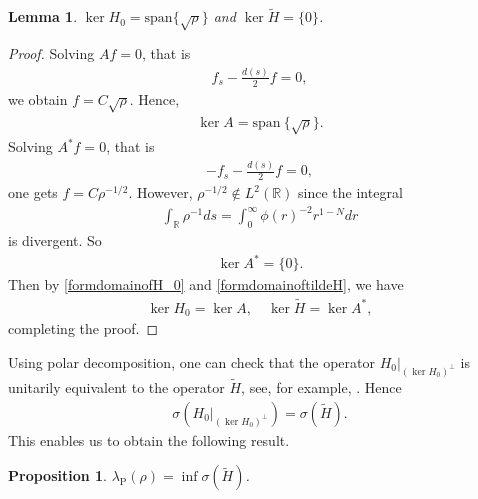 \documentclass{article}
\newtheorem{lemma}[theorem]{Lemma}
\newtheorem{proposition}[theorem]{Proposition}
\theoremstyle{definition} \theoremstyle{remark}
\numberwithin{equation}{section}
\newcommand{\R}{\mathbb{R}}
\newcommand{\la}{\lambda}
\begin{document}
	\begin{lemma}
		$\ker H_0 = \text{span}\{\sqrt{\rho}\}$ and $\ker \widetilde{H} = \{0\}$.
	\end{lemma}

	\begin{proof}
		Solving $Af = 0$, that is
		\begin{align*}
			f_s - \frac{d(s)}{2}f = 0,
		\end{align*}
		we obtain $f = C\sqrt{\rho}$. Hence,
		\begin{align*}
			\ker A = \text{span}~\{\sqrt{\rho}\}.
		\end{align*}
		Solving $A^*f = 0$, that is
		\begin{align*}
			-f_s - \frac{d(s)}{2}f = 0,
		\end{align*}
		one gets $f = C\rho^{-1/2}$. However, $\rho^{-1/2} \notin L^2(\R)$ since the integral
		\begin{align*}
			\int_{\R}\rho^{-1}ds = \int_0^\infty \phi(r)^{-2}r^{1-N}dr
		\end{align*}
		is divergent. So
		\begin{align*}
			\ker A^* = \{0\}.
		\end{align*}
		Then by \eqref{formdomainofH_0} and \eqref{formdomainoftildeH}, we have
		\begin{align*}
			\ker H_0 = \ker A, \quad \ker \widetilde{H} = \ker A^*,
		\end{align*}
		completing the proof.
	\end{proof}

	Using polar decomposition, one can check that the operator $H_0|_{(\ker H_0)^{\bot}}$ is unitarily equivalent to the operator $\widetilde{H}$, see, for example, \cite[Theorem 8.6]{Tes}. Hence
	\begin{align*}
		\sigma\left(H_0|_{(\ker H_0)^{\bot}}\right) = \sigma(\widetilde{H}).
	\end{align*}
	This enables us to obtain the following result.

	\begin{proposition} \label{propinfH}
		$\la_{\text{P}}(\rho) = \inf \sigma(\widetilde{H})$.
	\end{proposition}
\end{document}
